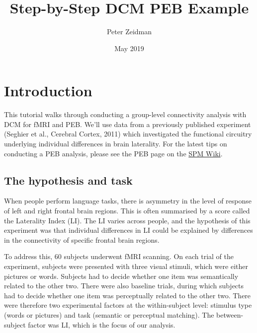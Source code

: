 \documentclass{article}
\title{Step-by-Step DCM PEB Example}
\author{Peter Zeidman}
\date{May 2019}
\begin{document}
\maketitle

\tableofcontents

\section{Introduction}
This tutorial walks through conducting a group-level connectivity analysis with DCM for fMRI and PEB. We'll use data from a previously published experiment (Seghier et al., Cerebral Cortex, 2011) which investigated the functional circuitry underlying individual differences in brain laterality. For the latest tips on conducting a PEB analysis, please see the PEB page on the \href{https://en.wikibooks.org/wiki/SPM/Parametric_Empirical_Bayes_(PEB)}{SPM Wiki}.

\subsection{The hypothesis and task}
When people perform language tasks, there is asymmetry in the level of response of left and right frontal brain regions. This is often summarised by a score called the Laterality Index (LI). The LI varies across people, and the hypothesis of this experiment was that individual differences in LI could be explained by differences in the connectivity of specific frontal brain regions. 

To address this, 60 subjects underwent fMRI scanning. On each trial of the experiment, subjects were presented with three visual stimuli, which were either pictures or words. Subjects had to decide whether one item was semantically related to the other two. There were also baseline trials, during which subjects had to decide whether one item was perceptually related to the other two. There were therefore two experimental factors at the within-subject level: stimulus type (words or pictures) and task (semantic or perceptual matching). The between-subject factor was LI, which is the focus of our analysis. 
\end{document}
